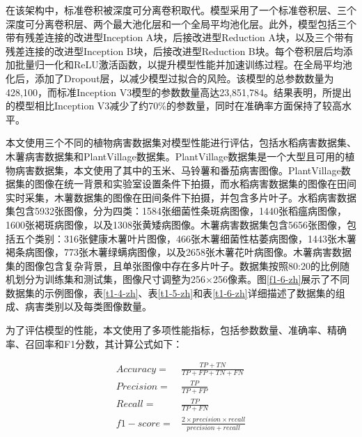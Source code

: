 在该架构中，标准卷积被深度可分离卷积取代。模型采用了一个标准卷积层、三个深度可分离卷积层、两个最大池化层和一个全局平均池化层。此外，模型包括三个带有残差连接的改进型Inception A块，后接改进型Reduction A块，以及三个带有残差连接的改进型Inception B块，后接改进型Reduction B块。每个卷积层后均添加批量归一化和ReLU激活函数，以提升模型性能并加速训练过程。在全局平均池化后，添加了Dropout层，以减少模型过拟合的风险。该模型的总参数数量为428,100，而标准Inception V3模型的参数数量高达23,851,784。结果表明，所提出的模型相比Inception V3减少了约70\%的参数量，同时在准确率方面保持了较高水平。


本文使用三个不同的植物病害数据集对模型性能进行评估，包括水稻病害数据集、木薯病害数据集和PlantVillage数据集。PlantVillage数据集是一个大型且可用的植物病害数据集，本文使用了其中的玉米、马铃薯和番茄病害图像。PlantVillage数据集的图像在统一背景和实验室设置条件下拍摄，而水稻病害数据集的图像在田间实时采集，木薯数据集的图像在田间条件下拍摄，并包含多片叶子。水稻病害数据集包含5932张图像，分为四类：1584张细菌性条斑病图像，1440张稻瘟病图像，1600张褐斑病图像，以及1308张黄矮病图像。木薯病害数据集包含5656张图像，包括五个类别：316张健康木薯叶片图像，466张木薯细菌性枯萎病图像，1443张木薯褐条病图像，773张木薯绿螨病图像，以及2658张木薯花叶病图像。木薯病害数据集的图像包含复杂背景，且单张图像中存在多片叶子。数据集按照80:20的比例随机划分为训练集和测试集，图像尺寸调整为256×256像素。图\ref{f1-6-zh}展示了不同数据集的示例图像，表\ref{t1-4-zh}、表\ref{t1-5-zh}和表\ref{t1-6-zh}详细描述了数据集的组成、病害类别以及每类图像数量。





为了评估模型的性能，本文使用了多项性能指标，包括参数数量、准确率、精确率、召回率和F1分数，其计算公式如下：

\begin{align*} Accuracy=&\frac {TP+TN}{TP+FP+TN+FN} \tag{3}\\ Precision=&\frac {TP}{TP+FP} \tag{4}\\ Recall=&\frac {TP}{TP+FN} \tag{5}\\ f1-score=&\frac {2\times precision\times recall }{precision + recall}\tag{6}\end{align*}

